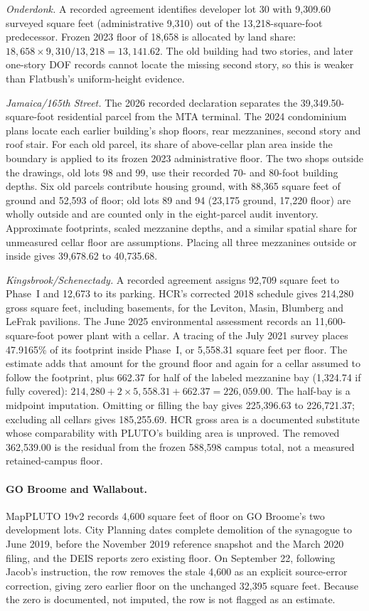 \textit{Onderdonk.} A recorded agreement identifies developer lot 30 with
9,309.60 surveyed square feet (administrative 9,310) out of the
13,218-square-foot predecessor. Frozen 2023 floor of 18,658 is allocated by
land share: $18{,}658\times9{,}310/13{,}218=13{,}141.62$. The old building had
two stories, and later one-story DOF records cannot locate the missing second
story, so this is weaker than Flatbush's uniform-height evidence.

\textit{Jamaica/165th Street.} The 2026 recorded declaration separates the
39,349.50-square-foot residential parcel from the MTA terminal. The 2024
condominium plans locate each earlier building's shop floors, rear
mezzanines, second story and roof stair. For each old parcel, its share of
above-cellar plan area inside the boundary is applied to its frozen 2023
administrative floor. The two shops outside the drawings, old lots 98 and 99,
use their recorded 70- and 80-foot building depths. Six old parcels contribute
housing ground, with 88,365 square feet of ground and 52,593 of floor; old lots
89 and 94 (23,175 ground, 17,220 floor) are wholly outside and are counted
only in the eight-parcel audit inventory. Approximate footprints, scaled
mezzanine depths, and a similar spatial share for unmeasured cellar floor are
assumptions. Placing all three mezzanines outside or inside gives 39,678.62
to 40,735.68.

\textit{Kingsbrook/Schenectady.} A recorded agreement assigns 92,709 square
feet to Phase~I and 12,673 to its parking. HCR's corrected 2018 schedule gives
214,280 gross square feet, including basements, for the Leviton, Masin,
Blumberg and LeFrak pavilions. The June 2025 environmental assessment records
an 11,600-square-foot power plant with a cellar. A tracing of the July 2021
survey places 47.9165\% of its footprint inside Phase~I, or 5,558.31 square
feet per floor. The estimate adds that amount for the ground floor and again
for a cellar assumed to follow the footprint, plus 662.37 for half of the
labeled mezzanine bay (1,324.74 if fully covered):
$214{,}280+2\times5{,}558.31+662.37=226{,}059.00$. The half-bay is a midpoint
imputation. Omitting or filling the bay gives 225,396.63 to 226,721.37;
excluding all cellars gives 185,255.69. HCR gross area is a documented
substitute whose comparability with PLUTO's building area is unproved. The
removed 362,539.00 is the residual from the frozen 588,598 campus total, not a
measured retained-campus floor.

\paragraph{GO Broome and Wallabout.}
MapPLUTO 19v2 records 4,600 square feet of floor on GO Broome's two
development lots. City Planning dates complete demolition of the synagogue
to June 2019, before the November 2019 reference snapshot and the March 2020
filing, and the DEIS reports zero existing floor. On September 22, following
Jacob's instruction, the row removes the stale 4,600 as an explicit
source-error correction, giving zero earlier floor on the unchanged 32,395
square feet. Because the zero is documented, not imputed, the row is not
flagged as an estimate.

